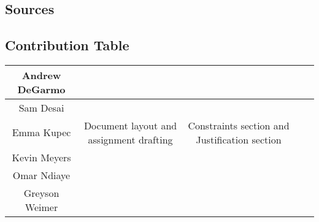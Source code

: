 \subsection{Sources}


\subsection{Contribution Table}
\begin{center}
    \begin{tabular}{|c|c|c|c|c|} 
        \hline
        Andrew DeGarmo & & & & \\
        \hline
        Sam Desai & & & & \\
        \hline
        Emma Kupec & Document layout and assignment drafting & Constraints section and Justification section & & \\
        \hline
        Kevin Meyers & & & & \\
        \hline
        Omar Ndiaye & & & & \\
        \hline
        Greyson Weimer & & & & \\
        \hline
    \end{tabular}
\end{center}
